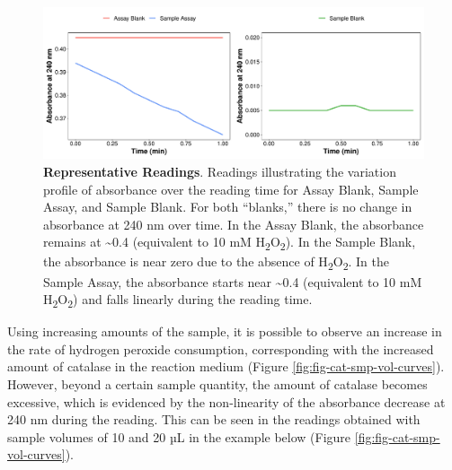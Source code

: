 \documentclass[
  9pt,
  american,
  a5paper,
  extrafontsizes,onecolumn,openright
  ]{memoir}
\begin{document}
\scriptsize

\begin{figure}

{\centering \includegraphics[width=1\linewidth]{Volume-1_files/figure-latex/fig-cat-assay-curves-1} 

}

\caption{\textbf{Representative Readings}. Readings illustrating the variation profile of absorbance over the reading time for Assay Blank, Sample Assay, and Sample Blank. For both \enquote{blanks,} there is no change in absorbance at 240 nm over time. In the Assay Blank, the absorbance remains at \textasciitilde0.4 (equivalent to 10 mM H\textsubscript{2}O\textsubscript{2}). In the Sample Blank, the absorbance is near zero due to the absence of H\textsubscript{2}O\textsubscript{2}. In the Sample Assay, the absorbance starts near \textasciitilde0.4 (equivalent to 10 mM H\textsubscript{2}O\textsubscript{2}) and falls linearly during the reading time.}\label{fig:fig-cat-assay-curves}
\end{figure}

\normalsize

Using increasing amounts of the sample, it is possible to observe an increase in the rate of hydrogen peroxide consumption, corresponding with the increased amount of catalase in the reaction medium (Figure \ref{fig:fig-cat-smp-vol-curves}). However, beyond a certain sample quantity, the amount of catalase becomes excessive, which is evidenced by the non-linearity of the absorbance decrease at 240 nm during the reading. This can be seen in the readings obtained with sample volumes of 10 and 20 µL in the example below (Figure \ref{fig:fig-cat-smp-vol-curves}).



\scriptsize
\end{document}
